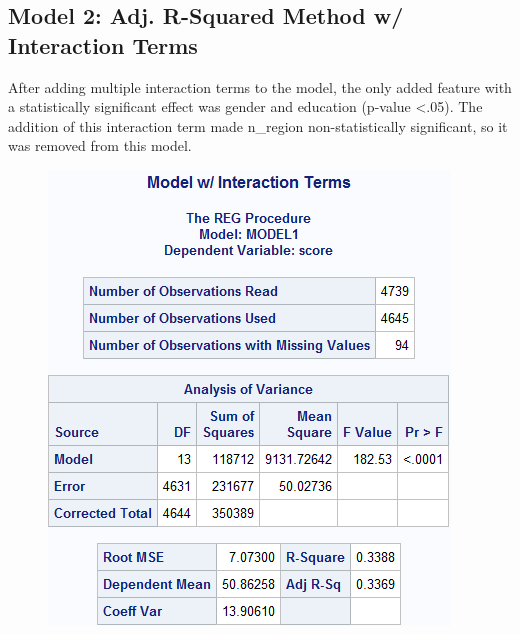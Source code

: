 \documentclass[12pt]{article}
\begin{document}
\subsection{Model 2: Adj. R-Squared Method w/ Interaction Terms}
After adding multiple interaction terms to the model, the only added feature with a statistically significant effect was gender and education (p-value \textless .05). The addition of this interaction term made n\_region non-statistically significant, so it was removed from this model.
\begin{figure}[h]
    \centering
    \begin{minipage}[t]{0.4\textwidth}
        \vspace{10pt}
        \centering
        \includegraphics[width=\textwidth]{images/model2_a.png}
        \label{fig:unemp_dist}
    \end{minipage}\hfill
    \begin{minipage}[t]{0.55\textwidth}
        \vspace{0pt}
        \centering

\end{minipage}
\end{figure}
\end{document}
